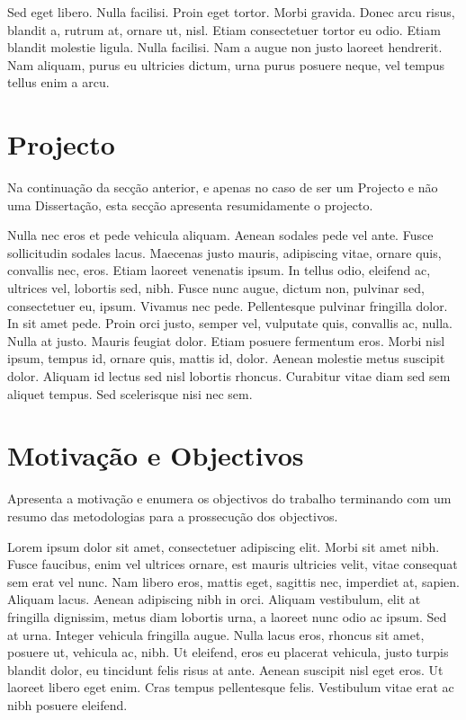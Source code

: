 Sed eget libero. Nulla facilisi. Proin eget tortor. Morbi
gravida. Donec arcu risus, blandit a, rutrum at, ornare ut,
nisl. Etiam consectetuer tortor eu odio. Etiam blandit molestie
ligula. Nulla facilisi. Nam a augue non justo laoreet hendrerit. Nam
aliquam, purus eu ultricies dictum, urna purus posuere neque, vel
tempus tellus enim a arcu. 

\section{Projecto} \label{sec:proj}

Na continuação da secção anterior, e apenas no caso de ser um Projecto
e não uma Dissertação, esta secção apresenta resumidamente o projecto.

Nulla nec eros et pede vehicula aliquam. Aenean sodales pede vel
ante. Fusce sollicitudin sodales lacus. Maecenas justo mauris,
adipiscing vitae, ornare quis, convallis nec, eros. Etiam laoreet
venenatis ipsum. In tellus odio, eleifend ac, ultrices vel, lobortis
sed, nibh. Fusce nunc augue, dictum non, pulvinar sed, consectetuer
eu, ipsum. Vivamus nec pede. Pellentesque pulvinar fringilla dolor. In
sit amet pede. Proin orci justo, semper vel, vulputate quis, convallis
ac, nulla. Nulla at justo. Mauris feugiat dolor. Etiam posuere
fermentum eros. Morbi nisl ipsum, tempus id, ornare quis, mattis id,
dolor. Aenean molestie metus suscipit dolor. Aliquam id lectus sed
nisl lobortis rhoncus. Curabitur vitae diam sed sem aliquet
tempus. Sed scelerisque nisi nec sem. 

\section{Motivação e Objectivos} \label{sec:goals}

Apresenta a motivação e enumera os objectivos do trabalho terminando
com um resumo das metodologias para a prossecução dos objectivos.

Lorem ipsum dolor sit amet, consectetuer adipiscing elit. Morbi sit
amet nibh. Fusce faucibus, enim vel ultrices ornare, est mauris
ultricies velit, vitae consequat sem erat vel nunc. Nam libero eros,
mattis eget, sagittis nec, imperdiet at, sapien. Aliquam lacus. Aenean
adipiscing nibh in orci. Aliquam vestibulum, elit at fringilla
dignissim, metus diam lobortis urna, a laoreet nunc odio ac ipsum. Sed
at urna. Integer vehicula fringilla augue. Nulla lacus eros, rhoncus
sit amet, posuere ut, vehicula ac, nibh. Ut eleifend, eros eu placerat
vehicula, justo turpis blandit dolor, eu tincidunt felis risus at
ante. Aenean suscipit nisl eget eros. Ut laoreet libero eget
enim. Cras tempus pellentesque felis. Vestibulum vitae erat ac nibh
posuere eleifend. 

